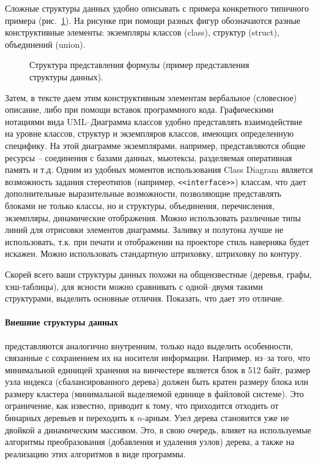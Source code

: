\documentclass[a4paper,14pt,final]{extreport}
\begin{document}
Сложные структуры данных удобно описывать с примера конкретного типичного примера (рис.~\ref{fig:datastructex}).  На рисунке при помощи разных фигур обозначаются разные конструктивные элементы: экземпляры классов (class), структур (struct), объединений (union).
\begin{figure}[hbt]
  \centering

  \caption[Пример структуры данных]{Структура представления формулы (пример представления структуры данных).}
  \label{fig:datastructex}
\end{figure}
Затем, в тексте даем этим конструктивным элементам вербальное (словесное) описание, либо при помощи вставок программного кода.  Графическими нотациями вида UML\;--\;Диаграмма классов удобно представлять взаимодействие на уровне классов, структур и экземпляров классов, имеющих определенную специфику.  На этой диаграмме экземплярами, например, представляются общие ресурсы -- соединения с базами данных, мьютексы, разделяемая оперативная память и т.д.  Одним из удобных моментов использования Class Diagram является возможность задания стереотипов (например, \texttt{<<interface>>}) классам, что дает дополнительные выразительные возможности, позволяющие представлять блоками не только классы, но и структуры, объединения, перечисления, экземпляры, динамические отображения.  Можно использовать различные типы линий для отрисовки элементов диаграммы.  Заливку и полутона лучше не использовать, т.к. при печати и отображении на проекторе стиль наверняка будет искажен.  Можно использовать стандартную штриховку, штриховку по контуру.

Скорей всего ваши структуры данных похожи на общеизвестные (деревья, графы, хэш-таблицы), для ясности можно сравнивать с одной--двумя такими структурами, выделить основные отличия.  Показать, что дает это отличие.

\paragraph{Внешние структуры данных} представляются аналогично внутренним, только надо выделить особенности, связанные с сохранением их на носители информации.  Например, из--за того, что минимальной единицей хранения на винчестере является блок в 512 байт, размер узла индекса (сбалансированного дерева) должен быть кратен размеру блока или размеру кластера (минимальной выделяемой единице в файловой системе).  Это ограничение, как известно, приводит к тому, что приходится отходить от бинарных деревьев и переходить к $n$-арным.  Узел дерева становится уже не двойкой а динамическим массивом.  Это, в свою очередь, влияет на используемые алгоритмы преобразования (добавления и удаления узлов) дерева, а также на реализацию этих алгоритмов в виде программы.
\end{document}
